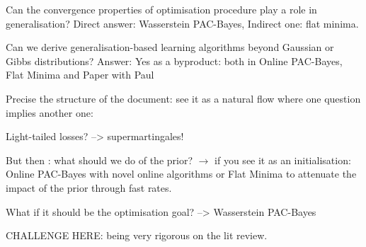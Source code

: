 Can the convergence properties of optimisation procedure play a role in generalisation? Direct answer: Wasserstein PAC-Bayes, Indirect one: flat minima. 

Can we derive generalisation-based learning algorithms beyond Gaussian or Gibbs distributions? Answer: Yes as a byproduct: both in Online PAC-Bayes, Flat Minima and Paper with Paul  

Precise the structure of the document: see it as a natural flow where one question implies another one: 

Light-tailed losses? --> supermartingales! 

But then : what should we do of the prior? $\rightarrow$  if you see it as an initialisation: Online PAC-Bayes with novel online algorithms or Flat Minima to attenuate the impact of the prior through fast rates.

What if it should be the optimisation goal? --> Wasserstein PAC-Bayes



 


CHALLENGE HERE: being very rigorous on the lit review.
